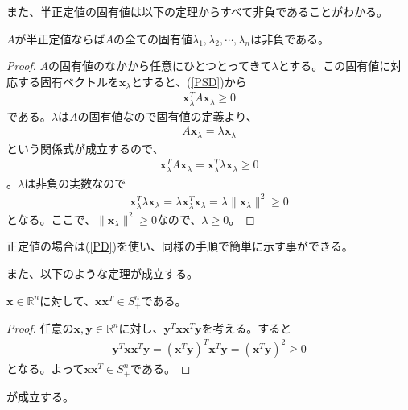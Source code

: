 また、半正定値の固有値は以下の定理からすべて非負であることがわかる。
\begin{theorem*}
  $A$が半正定値ならば$A$の全ての固有値$\lambda_1, \lambda_2, \cdots, \lambda_n$は非負である。
\end{theorem*}
\begin{proof}
  $A$の固有値のなかから任意にひとつとってきて$\lambda$とする。この固有値に対応する固有ベクトルを$\mathbf{x}_\lambda$とすると、(\ref{PSD})から
  \begin{align*}
    \mathbf{x}_\lambda^T A \mathbf{x}_\lambda \geq 0
  \end{align*}
  である。$\lambda$は$A$の固有値なので固有値の定義より、
  \begin{align*}
    A \mathbf{x}_\lambda = \lambda \mathbf{x}_\lambda
  \end{align*}
  という関係式が成立するので、
  \begin{align*}
    \mathbf{x}_\lambda^T A \mathbf{x}_\lambda = \mathbf{x}_\lambda^T \lambda \mathbf{x}_\lambda \geq 0
  \end{align*}
  。$\lambda$は非負の実数なので
  \begin{align*}
    \mathbf{x}_\lambda^T \lambda \mathbf{x}_\lambda = \lambda \mathbf{x}_\lambda^T \mathbf{x}_\lambda = \lambda \|\mathbf{x}_\lambda\|^2 \geq 0
  \end{align*}
  となる。ここで、$\|\mathbf{x}_\lambda\|^2 \geq 0$なので、$\lambda \geq 0$。
\end{proof}
正定値の場合は(\ref{PD})を使い、同様の手順で簡単に示す事ができる。

また、以下のような定理が成立する。
\begin{theorem} \label{PsdMatrix}
  $\mathbf{x} \in \mathbb{R}^n$に対して、$\mathbf{x} \mathbf{x}^T \in S_+^n$である。
\end{theorem}
\begin{proof}
  任意の$\mathbf{x}, \mathbf{y} \in \mathbb{R}^n$に対し、$\mathbf{y}^T \mathbf{x} \mathbf{x}^T \mathbf{y}$を考える。すると
  \begin{align*}
    \mathbf{y}^T \mathbf{x} \mathbf{x}^T \mathbf{y} = \left(\mathbf{x}^T \mathbf{y}\right)^T \mathbf{x}^T \mathbf{y} = \left(\mathbf{x}^T \mathbf{y}\right)^2 \geq 0
  \end{align*}
  となる。よって$\mathbf{x} \mathbf{x}^T \in S_+^n$である。
\end{proof}
が成立する。
